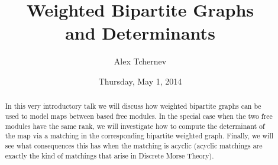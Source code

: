 \documentclass{UAmathtalk}
\author{Alex Tchernev}
\title{Weighted Bipartite Graphs\\ and Determinants}
\date{Thursday, May 1, 2014}
\begin{document}
\maketitle

\begin{abstract}
In this very introductory talk we will discuss how weighted bipartite graphs can be used to model maps between based free modules.
In the special case when the two free modules have the same rank, we will investigate how to compute the determinant of the map via a matching in the corresponding bipartite weighted graph.
Finally, we will see what consequences this has when the matching is acyclic (acyclic matchings are exactly the kind of matchings that arise in Discrete Morse Theory).
\end{abstract}
\end{document}
